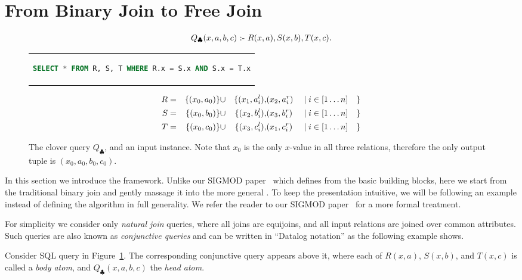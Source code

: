 \section{From Binary Join to Free Join}\label{sec:background}

\begin{figure}
  \begin{align*}
    Q_{\clubsuit}(x,a,b,c) \text{ :- } R(x,a),S(x,b),T(x,c).
  \end{align*}
  \begin{center}
    \begin{tabular}{c}
      \begin{lstlisting}[language=SQL, numbers=none]
SELECT * FROM R, S, T WHERE R.x = S.x AND S.x = T.x
\end{lstlisting}
    \end{tabular}
  \end{center}
  \begin{alignat*}{8}
    R & = & \{(x_0, a_0)\} & \cup & \{(x_1, a_i^l), & (x_2, a_i^r) &  & \mid i \in [1 \ldots n] & \} \\
    S & = & \{(x_0, b_0)\} & \cup & \{(x_2, b_i^l), & (x_3, b_i^r) &  & \mid i \in [1 \ldots n] & \} \\
    T & = & \{(x_0, c_0)\} & \cup & \{(x_3, c_i^l), & (x_1, c_i^r) &  & \mid i \in [1 \ldots n] & \}
  \end{alignat*}
  \caption{The clover query $Q_\clubsuit$, and an input instance.
    Note that $x_0$ is the only $x$-value in all three relations,
    therefore the only output tuple is $(x_0, a_0, b_0, c_0)$. }
  \label{fig:clover-query}
\end{figure}

In this section we introduce the \FJ framework.
Unlike our SIGMOD paper~\cite{10.1145/3589295} which defines \FJ from
the basic building blocks,
here we start from the traditional binary join
and gently massage it into the more general \FJ.
To keep the presentation intuitive,
we will be following an example instead of
defining the algorithm in full generality.
We refer the reader to our SIGMOD paper~\cite{10.1145/3589295}
for a more formal treatment.

For simplicity we consider only {\em natural join} queries,
where all joins are equijoins, and all input relations
are joined over common attributes.
Such queries are also known as {\em conjunctive queries}
and can be written in ``Datalog notation'' as the following
example shows.

\begin{example} \label{ex:triangle}
  Consider SQL query in Figure~\ref{fig:clover-query}.
  The corresponding conjunctive query appears above it,
  where each of $R(x, a)$, $S(x, b)$, and $T(x, c)$
  is called a {\em body atom}, and $Q_\clubsuit(x, a, b, c)$
  the {\em head atom}.
\end{example}

